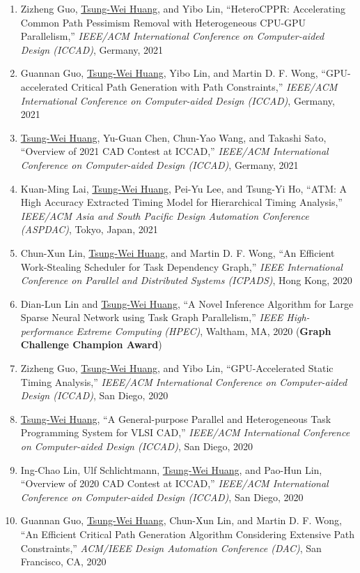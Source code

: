 \documentclass[A4,11pt]{article}
\begin{document}
\begin{enumerate}
    \item Zizheng Guo, \underline{Tsung-Wei Huang}, and Yibo Lin, ``HeteroCPPR: Accelerating Common Path Pessimism Removal with Heterogeneous CPU-GPU Parallelism,'' \textit{IEEE/ACM International Conference on Computer-aided Design (ICCAD)}, Germany, 2021
    \item Guannan Guo, \underline{Tsung-Wei Huang}, Yibo Lin, and Martin D. F. Wong, ``GPU-accelerated Critical Path Generation with Path Constraints,'' \textit{IEEE/ACM International Conference on Computer-aided Design (ICCAD)}, Germany, 2021
    \item \underline{Tsung-Wei Huang}, Yu-Guan Chen, Chun-Yao Wang, and Takashi Sato, ``Overview of 2021 CAD Contest at ICCAD,'' \textit{IEEE/ACM International Conference on Computer-aided Design (ICCAD)}, Germany, 2021
    \item Kuan-Ming Lai, \underline{Tsung-Wei Huang}, Pei-Yu Lee, and Tsung-Yi Ho, ``ATM: A High Accuracy Extracted Timing Model for Hierarchical Timing Analysis,'' \textit{IEEE/ACM Asia and South Pacific Design Automation Conference (ASPDAC)}, Tokyo, Japan, 2021
    \item Chun-Xun Lin, \underline{Tsung-Wei Huang}, and Martin D. F. Wong, ``An Efficient Work-Stealing Scheduler for Task Dependency Graph,'' \textit{IEEE International Conference on Parallel and Distributed Systems (ICPADS)}, Hong Kong, 2020
    \item Dian-Lun Lin and \underline{Tsung-Wei Huang}, ``A Novel Inference Algorithm for Large Sparse Neural Network using Task Graph Parallelism,'' \textit{IEEE High-performance Extreme Computing (HPEC)}, Waltham, MA, 2020 (\textbf{Graph Challenge Champion Award})
    \item Zizheng Guo, \underline{Tsung-Wei Huang}, and Yibo Lin, ``GPU-Accelerated Static Timing Analysis,'' \textit{IEEE/ACM International Conference on Computer-aided Design (ICCAD)}, San Diego, 2020 
    \item \underline{Tsung-Wei Huang}, ``A General-purpose Parallel and Heterogeneous Task Programming System for VLSI CAD,'' \textit{IEEE/ACM International Conference on Computer-aided Design (ICCAD)}, San Diego, 2020
    \item Ing-Chao Lin, Ulf Schlichtmann, \underline{Tsung-Wei Huang}, and Pao-Hun Lin, ``Overview of 2020 CAD Contest at ICCAD,'' \textit{IEEE/ACM International Conference on Computer-aided Design (ICCAD)}, San Diego, 2020
    \item Guannan Guo, \underline{Tsung-Wei Huang}, Chun-Xun Lin, and Martin D. F. Wong, ``An Efficient Critical Path Generation Algorithm Considering Extensive Path Constraints,'' \textit{ACM/IEEE Design Automation Conference (DAC)}, San Francisco, CA, 2020

\end{enumerate}
\end{document}
